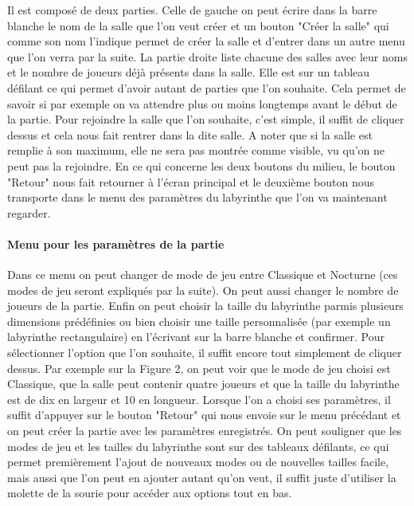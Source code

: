 \documentclass{article}
\begin{document}
Il est composé de deux parties. Celle de gauche on peut écrire dans la barre blanche le nom de la salle que l'on veut créer et un bouton "Créer la salle" qui comme son nom l'indique permet de créer la salle et d'entrer dans un autre menu que l'on verra par la suite. La partie droite liste chacune des salles avec leur noms et le nombre de joueurs déjà présents dans la salle. Elle est sur un tableau défilant ce qui permet d'avoir autant de parties que l'on souhaite. Cela permet de savoir si par exemple on va attendre plus ou moins longtemps avant le début de la partie. Pour rejoindre la salle que l'on souhaite, c'est simple, il suffit de cliquer dessus et cela nous fait rentrer dans la dite salle. A noter que si la salle est remplie à son maximum, elle ne sera pas montrée comme visible, vu qu'on ne peut pas la rejoindre. En ce qui concerne les deux boutons du milieu, le bouton "Retour" nous fait retourner à l'écran principal et le deuxième bouton nous transporte dans le menu des paramètres du labyrinthe que l'on va maintenant regarder.

\paragraph{Menu pour les paramètres de la partie}

Dans ce menu on peut changer de mode de jeu entre Classique et Nocturne (ces modes de jeu seront expliqués par la suite). On peut aussi changer le nombre de joueurs de la partie. Enfin on peut choisir la taille du labyrinthe parmis plusieurs dimensions prédéfinies ou bien choisir une taille personnalisée (par exemple un labyrinthe rectangulaire) en l'écrivant sur la barre blanche et confirmer. Pour sélectionner l'option que l'on souhaite, il suffit encore tout simplement de cliquer dessus. Par exemple sur la Figure 2, on peut voir que le mode de jeu choisi est Classique, que la salle peut contenir quatre joueurs et que la taille du labyrinthe est de dix en largeur et 10 en longueur. Lorsque l'on a choisi ses paramètres, il suffit d'appuyer sur le bouton "Retour" qui nous envoie sur le menu précédant et on peut créer la partie avec les paramètres enregistrés. On peut souligner que les modes de jeu et les tailles du labyrinthe sont sur des tableaux défilants, ce qui permet premièrement l'ajout de nouveaux modes ou de nouvelles tailles facile, mais aussi que l'on peut en ajouter autant qu'on veut, il suffit juste d'utiliser la molette de la sourie pour accéder aux options tout en bas.
\end{document}
